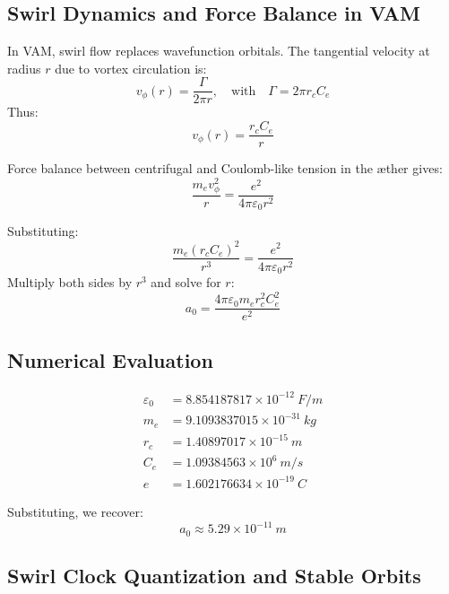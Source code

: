 \subsection*{Swirl Dynamics and Force Balance in VAM}

In VAM, swirl flow replaces wavefunction orbitals. The tangential velocity at radius $r$ due to vortex circulation is:
\begin{equation}
    v_\phi(r) = \frac{\Gamma}{2\pi r}, \quad \text{with} \quad \Gamma = 2\pi r_c C_e
\end{equation}
Thus:
\begin{equation}
    v_\phi(r) = \frac{r_c C_e}{r}
\end{equation}

Force balance between centrifugal and Coulomb-like tension in the \ae ther gives:
\begin{equation}
    \frac{m_e v_\phi^2}{r} = \frac{e^2}{4\pi \varepsilon_0 r^2}
\end{equation}

Substituting:
\begin{equation}
    \frac{m_e (r_c C_e)^2}{r^3} = \frac{e^2}{4\pi \varepsilon_0 r^2}
\end{equation}
Multiply both sides by $r^3$ and solve for $r$:
\begin{equation}
    a_0 = \frac{4\pi \varepsilon_0 m_e r_c^2 C_e^2}{e^2}
\end{equation}

\subsection*{Numerical Evaluation}

\begin{align*}
    \varepsilon_0 &= 8.854187817 \times 10^{-12}~\si{F/m} \\
    m_e &= 9.1093837015 \times 10^{-31}~\si{kg} \\
    r_c &= 1.40897017 \times 10^{-15}~\si{m} \\
    C_e &= 1.09384563 \times 10^6~\si{m/s} \\
    e &= 1.602176634 \times 10^{-19}~\si{C}
\end{align*}

Substituting, we recover:
\[
    a_0 \approx 5.29 \times 10^{-11}~\si{m}
\]

\subsection*{Swirl Clock Quantization and Stable Orbits}

